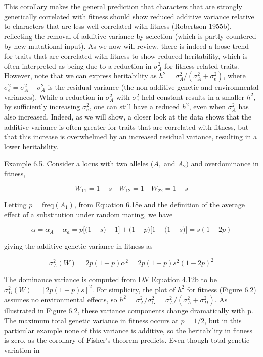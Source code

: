 \documentclass{article}
\begin{document}
This corollary makes the general prediction that characters that are strongly genetically correlated with fitness should show reduced additive variance relative to characters that are less well correlated with fitness (Robertson 1955b), reflecting the removal of additive variance by selection (which is partly countered by new mutational input). As we now will review, there is indeed a loose trend for traits that are correlated with fitness to show reduced heritability, which is often interpreted as being due to a reduction in  $ \sigma_A^2 $ for fitness-related traits. However, note that we can express heritability as  $ h^2 = \sigma_A^2 / (\sigma_A^2 + \sigma_e^2) $, where  $ \sigma_e^2 = \sigma_A^2 - \sigma_A^2 $ is the residual variance (the non-additive genetic and environmental variances). While a reduction in  $ \sigma_A^2 $ with  $ \sigma_e^2 $ held constant results in a smaller  $ h^2 $, by sufficiently increasing  $ \sigma_e^2 $, one can still have a reduced  $ h^2 $, even when  $ \sigma_A^2 $ has also increased. Indeed, as we will show, a closer look at the data shows that the additive variance is often greater for traits that are correlated with fitness, but that this increase is overwhelmed by an increased residual variance, resulting in a lower heritability.

Example 6.5. Consider a locus with two alleles  $ (A_{1} $ and  $ A_{2}) $ and overdominance in fitness,

\begin{equation}
W_{11}=1-s\quad W_{12}=1\quad W_{22}=1-s
\end{equation}

Letting  $ p = \text{freq}(A_1) $, from Equation 6.18e and the definition of the average effect of a substitution under random mating, we have

\begin{equation}
\alpha=\alpha_{A}-\alpha_{a}=p\big[\big(1-s\big)-1\big]+\big(1-p\big)\big[1-\big(1-s\big)\big]=s(1-2p)
\end{equation}

giving the additive genetic variance in fitness as

\begin{equation}
\sigma_{A}^{2}(W)=2p(1-p)\alpha^{2}=2p(1-p)s^{2}(1-2p)^{2}
\end{equation}

The dominance variance is computed from LW Equation 4.12b to be  $ \sigma_D^2(W) = [2p(1-p)s]^2 $. For simplicity, the plot of  $ h^2 $ for fitness (Figure 6.2) assumes no environmental effects, so  $ h^2 = \sigma_A^2/\sigma_G^2 = \sigma_A^2/(\sigma_A^2 + \sigma_D^2) $. As illustrated in Figure 6.2, these variance components change dramatically with p. The maximum total genetic variance in fitness occurs at  $ p = 1/2 $, but in this particular example none of this variance is additive, so the heritability in fitness is zero, as the corollary of Fisher's theorem predicts. Even though total genetic variation in
\end{document}
